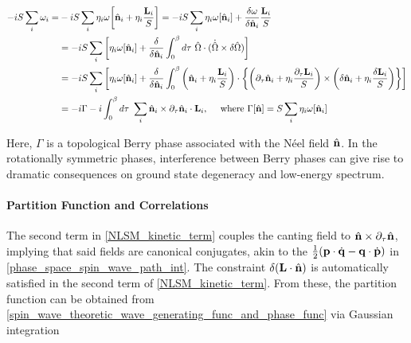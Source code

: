 \begin{equation}
    \begin{split}
        -iS \sum_{i} \omega_i =& - iS \sum_{i} \eta_i \omega\bigg[\hat{\bf n}_i + \eta_i \frac{{\bf L}_i}{S}\bigg] = -iS \sum_{i} \eta_i \omega[\hat{{\bf n}}_i] + \frac{\delta \omega}{\delta \hat{{\bf n}}_i} \frac{{\bf L}_i}{S} \\
        &=  -iS \sum_{i} \bigg[\eta_i \omega[\hat{{\bf n}}_i] + \frac{\delta}{\delta \hat{{\bf n}}_i} \int_{0}^{\beta} d\tau \textnormal{ } \hat{\Omega} \cdot (\dot{\hat{\Omega}} \times \delta \hat{\Omega}) \bigg]\\
        &=  -iS \sum_{i} \bigg[\eta_i \omega[\hat{{\bf n}}_i] + \frac{\delta}{\delta \hat{{\bf n}}_i} \int_{0}^{\beta}
        \bigg( \hat{{\bf n}}_i + \eta_i \frac{{\bf L}_i}{S} \bigg) \cdot \bigg\{
        \bigg( \partial_{\tau}{\hat{{\bf n}}}_i + \eta_i \frac{\partial_{\tau}{{\bf L}}_i}{S}\bigg) \times 
        \bigg( \delta\hat{\bf n}_i + \eta_i \frac{\delta{\bf L}_i}{S}\bigg) \bigg\}\bigg]\\
        &= -i \Gamma - i \int_{0}^{\beta} d\tau \textnormal{ } \sum_{i} \hat{{\bf n}}_i \times \partial_{\tau} \hat{{\bf n}}_i \cdot {\bf L}_i, \quad \textnormal{ where } \Gamma[\hat{{\bf n}}] = S \sum_{i} \eta_i \omega[\hat{{\bf n}}_i]
        \label{NLSM_kinetic_term}
    \end{split}
\end{equation}

Here, $\Gamma$ is a topological Berry phase associated with the Néel field $\hat{{\bf n}}$. In the rotationally symmetric phases, interference between Berry phases can give rise to dramatic consequences on ground state degeneracy and low-energy spectrum. \\

\paragraph{Partition Function and Correlations}

The second term in \cref{NLSM_kinetic_term} couples the canting field to $\hat{\bf n} \times \partial_{\tau}\hat{\bf n}$, implying that said fields are canonical conjugates, akin to the $\frac{1}{2} ({\bf p} \cdot \dot{\bf q} - {\bf q} \cdot \dot{\bf p})$ in \cref{phase_space_spin_wave_path_int}. 
The constraint $\delta({\bf L} \cdot \hat{{\bf n}})$ is automatically satisfied in the second term of \cref{NLSM_kinetic_term}. From these, the partition function can be obtained from \cref{spin_wave_theoretic_wave_generating_func_and_phase_func} via Gaussian integration 

